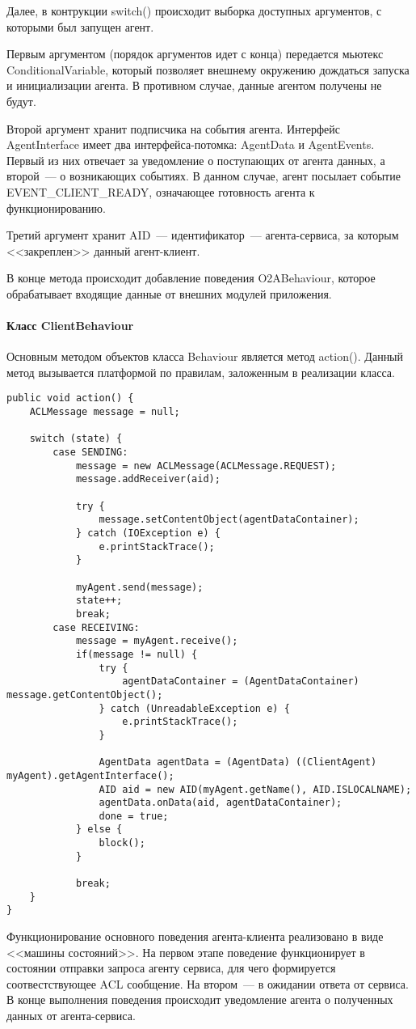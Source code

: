 Далее, в контрукции switch() происходит выборка доступных аргументов, с которыми был запущен агент.

Первым аргументом (порядок аргументов идет с конца) передается мьютекс ConditionalVariable, который позволяет внешнему окружению дождаться запуска и инициализации агента. В противном случае, данные агентом получены не будут.

Второй аргумент хранит подписчика на события агента. Интерфейс AgentInterface имеет два интерфейса-потомка: AgentData и AgentEvents. Первый из них отвечает за уведомление о поступающих от агента данных, а второй~--- о возникающих событиях. В данном случае, агент посылает событие EVENT\_CLIENT\_READY, означающее готовность агента к функционированию.

Третий аргумент хранит AID~--- идентификатор~--- агента-сервиса, за которым <<закреплен>> данный агент-клиент.

В конце метода происходит добавление поведения O2ABehaviour, которое обрабатывает входящие данные от внешних модулей приложения.

\paragraph{Класс ClientBehaviour}
Основным методом объектов класса Behaviour является метод action(). Данный метод вызывается платформой по правилам, заложенным в реализации класса.

\begin{verbatim}
public void action() {
    ACLMessage message = null;

    switch (state) {
        case SENDING:
            message = new ACLMessage(ACLMessage.REQUEST);
            message.addReceiver(aid);

            try {
                message.setContentObject(agentDataContainer);
            } catch (IOException e) {
                e.printStackTrace();
            }

            myAgent.send(message);
            state++;
            break;
        case RECEIVING:
            message = myAgent.receive();
            if(message != null) {
                try {
                    agentDataContainer = (AgentDataContainer) message.getContentObject();
                } catch (UnreadableException e) {
                    e.printStackTrace();
                }

                AgentData agentData = (AgentData) ((ClientAgent) myAgent).getAgentInterface();
                AID aid = new AID(myAgent.getName(), AID.ISLOCALNAME);
                agentData.onData(aid, agentDataContainer);
                done = true;
            } else {
                block();
            }

            break;
    }
}
\end{verbatim}
Функционирование основного поведения агента-клиента реализовано в виде <<машины состояний>>. На первом этапе поведение функционирует в состоянии отправки запроса агенту сервиса, для чего формируется соотвестствующее ACL сообщение. На втором~--- в ожидании ответа от сервиса. В конце выполнения поведения происходит уведомление агента о полученных данных от агента-сервиса.


